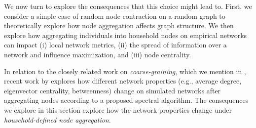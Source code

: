 We now turn to explore the consequences that this choice might lead to. First, we consider a simple case of random node contraction on a random graph to theoretically explore how node aggregation affects graph structure. We then explore how aggregating individuals into household nodes on empirical networks can impact (i) local network metrics, (ii) the spread of information over a network and influence maximization, and (iii) node centrality.

In relation to the closely related work on \textit{coarse-graining}, which we mention in , recent work by \cite{griebenow2019finding} explores how different network properties (e.g., average degree, eigenvector centrality, betweenness) change on simulated networks after aggregating nodes according to a proposed spectral algorithm. The consequences we explore in this section explore how the network properties change under \textit{household-defined node aggregation}.


